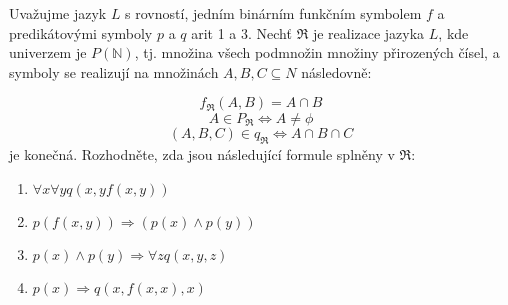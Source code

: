 \subsubsection{}
Uvažujme jazyk $L$ s rovností, jedním binárním funkčním symbolem $f$ a
predikátovými symboly $p$ a $q$ arit 1 a 3. Nechť $\Re$ je realizace jazyka $L$, 
kde univerzem je $P(\mathbb{N})$, tj. množina všech podmnožin množiny přirozených čísel, a symboly se realizují
na množinách $A, B, C \subseteq  N$ následovně:

$$f_{\Re }(A,B)=A\cap B$$
$$A \in P_{\Re} \Leftrightarrow A \neq \phi $$
$$(A,B,C) \in q_{\Re} \Leftrightarrow A \cap B \cap C$$ je konečná.
Rozhodněte, zda jsou následující formule splněny v $\Re$:
\begin{enumerate}[1)]
  \item $\forall x \forall y q(x,yf(x,y))$
  \item $p(f(x,y)) \Rightarrow (p(x) \wedge p(y))$
  \item $p(x) \wedge p(y) \Rightarrow \forall z q(x,y,z)$
  \item $p(x) \Rightarrow q(x, f(x,x), x)$
\end{enumerate}
